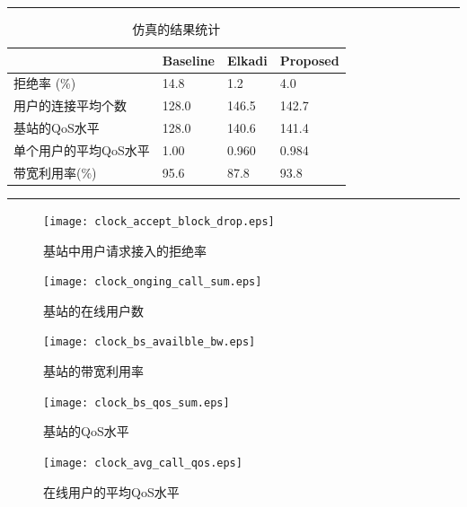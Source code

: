 \begin{table}[tb]
\caption{仿真的结果统计} \label{tb_cacop_res_sim}
\begin{center}
\def\temptablewidth{1\textwidth}
{\rule{\temptablewidth}{1pt}}
\begin{tabular*}{\temptablewidth}{@{\extracolsep{\fill}}llll}
 &Baseline &Elkadi &Proposed\\
\hline
拒绝率 (\%) &14.8 & 1.2 &4.0\\
用户的连接平均个数&128.0 &146.5 &142.7\\
基站的QoS水平 &128.0 &140.6 &141.4\\
单个用户的平均QoS水平 &1.00 &0.960 &0.984\\
带宽利用率(\%) &95.6 &87.8 &93.8\\
 \hline
\end{tabular*}
 {\rule{\temptablewidth}{1pt}}
 \end{center}
\end{table}

%
\begin{figure}[htb]
\centering
\texttt{[image: clock\_accept\_block\_drop.eps]}
\caption{基站中用户请求接入的拒绝率}
\label{cacop_pic_clock_accept_block_drop}
\end{figure}

%
\begin{figure}[htb]
\centering
\texttt{[image: clock\_onging\_call\_sum.eps]}
\caption{基站的在线用户数}\label{cacop_pic_clock_onging_call_sum}
\end{figure}

% 
\begin{figure}[htb]
\centering
\texttt{[image: clock\_bs\_availble\_bw.eps]}
\caption{基站的带宽利用率}\label{cacop_pic_clock_bs_availble_bw}
\end{figure}

%
\begin{figure}[htb]
\centering
\texttt{[image: clock\_bs\_qos\_sum.eps]}
\caption{基站的QoS水平}\label{cacop_pic_clock_bs_qos_sum}
\end{figure}

% 
\begin{figure}[htb]
\centering
\texttt{[image: clock\_avg\_call\_qos.eps]}
\caption{在线用户的平均QoS水平}\label{cacop_pic_clock_avg_call_qos}
\end{figure}
\fi
